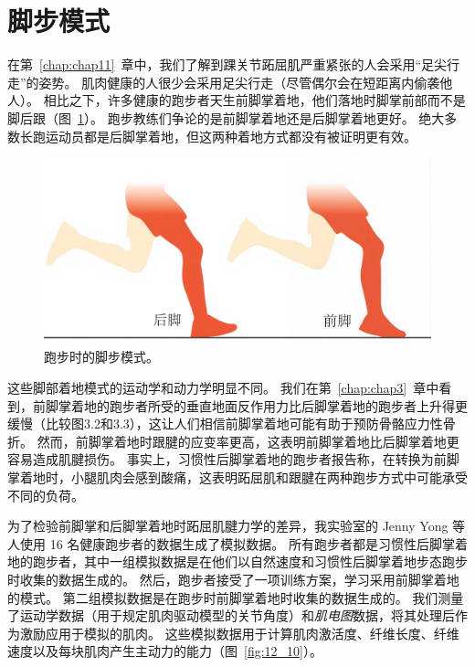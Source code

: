 \section{脚步模式}

在第~\ref{chap:chap11}~章中，我们了解到踝关节跖屈肌严重紧张的人会采用“足尖行走”的姿势。
肌肉健康的人很少会采用足尖行走（尽管偶尔会在短距离内偷袭他人）。
相比之下，许多健康的跑步者天生前脚掌着地，他们落地时脚掌前部而不是脚后跟（图~\ref{fig:12_9}）。
跑步教练们争论的是前脚掌着地还是后脚掌着地更好。
绝大多数长跑运动员都是后脚掌着地，但这两种着地方式都没有被证明更有效。


\begin{figure}[!htb]
	\centering
	\includegraphics[width=0.5\linewidth]{chap12/12_9}
	\caption{跑步时的脚步模式。 \label{fig:12_9}}
\end{figure}


这些脚部着地模式的运动学和动力学明显不同。
我们在第~\ref{chap:chap3}~章中看到，前脚掌着地的跑步者所受的垂直地面反作用力比后脚掌着地的跑步者上升得更缓慢（比较图3.2和3.3），这让人们相信前脚掌着地可能有助于预防骨骼应力性骨折。
然而，前脚掌着地时跟腱的应变率更高\cite{lyght2016effects}，这表明前脚掌着地比后脚掌着地更容易造成肌腱损伤。
事实上，习惯性后脚掌着地的跑步者报告称，在转换为前脚掌着地时，小腿肌肉会感到酸痛，这表明跖屈肌和跟腱在两种跑步方式中可能承受不同的负荷。


为了检验前脚掌和后脚掌着地时跖屈肌腱力学的差异，我实验室的 Jenny Yong 等人使用 16 名健康跑步者的数据生成了模拟数据。
所有跑步者都是习惯性后脚掌着地的跑步者，其中一组模拟数据是在他们以自然速度和习惯性后脚掌着地步态跑步时收集的数据生成的。
然后，跑步者接受了一项训练方案，学习采用前脚掌着地的模式。
第二组模拟数据是在跑步时前脚掌着地时收集的数据生成的。
我们测量了运动学数据（用于规定肌肉驱动模型的关节角度）和\textit{肌电图}数据，将其处理后作为激励应用于模拟的肌肉。
这些模拟数据用于计算肌肉激活度、纤维长度、纤维速度以及每块肌肉产生主动力的能力（图~\ref{fig:12_10}）。

